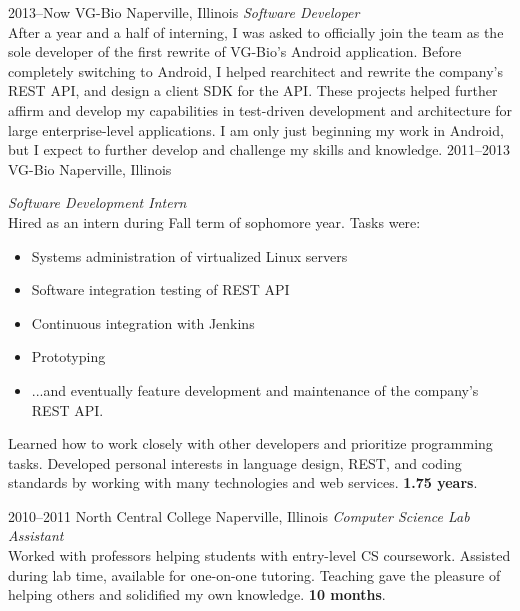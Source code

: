 \documentclass[]{friggeri-cv} %
\begin{document}
\begin{entrylist}
\entry
{2013--Now}
{VG-Bio}
{Naperville, Illinois}
{\emph{Software Developer} \\
    After a year and a half of interning, I was asked to officially join the team as the sole developer of the first rewrite of VG-Bio's Android application.
    Before completely switching to Android, I helped rearchitect and rewrite the company's REST API, and design a client SDK for the API.
    These projects helped further affirm and develop my capabilities in test-driven development and architecture for large enterprise-level applications.
    I am only just beginning my work in Android, but I expect to further develop and challenge my skills and knowledge.
}
\entry
{2011--2013}
{VG-Bio}
{Naperville, Illinois}
{\emph{Software Development Intern} \\
    Hired as an intern during Fall term of sophomore year.
    Tasks were:
    \begin{itemize}
        \item Systems administration of virtualized Linux servers
        \item Software integration testing of REST API
        \item Continuous integration with Jenkins
        \item Prototyping
        \item ...and eventually feature development and maintenance of the company's REST API.
    \end{itemize}
    Learned how to work closely with other developers and prioritize programming tasks.
    Developed personal interests in language design, REST, and coding standards by working with many technologies and web services. \textbf{1.75 years}.}
\entry
{2010--2011}
{North Central College}
{Naperville, Illinois}
{\emph{Computer Science Lab Assistant} \\
Worked with professors helping students with entry-level CS coursework.
Assisted during lab time, available for one-on-one tutoring.
Teaching gave the pleasure of helping others and solidified my own knowledge. \textbf{10 months}.}
\end{entrylist}
\end{document}
